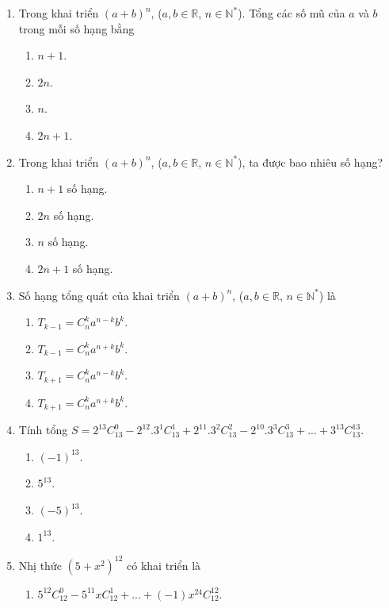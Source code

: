 \begin{enumerate}[label=\textbf{Câu \arabic*.},align=left,left=0cm..0cm,itemindent=*]
\begin{enumerate}[label=\textbf{\Alph*.},align=left,left=1cm..0cm,itemindent=*]
	\end{enumerate}
	\item Trong khai triển $(a+b)^n$, ($a,b\in\mathbb{R}$, $n\in\mathbb{N}^{*}$). Tổng các số mũ của $a$ và $b$ trong mỗi số hạng bằng
	\begin{enumerate}[label=\textbf{\Alph*.},align=left,left=1cm..0cm,itemindent=*]
		\item $n+1$. \item $2n$. \item $n$. \item $2n+1$.
	\end{enumerate}
	\item Trong khai triển $(a+b)^n$, ($a,b\in\mathbb{R}$, $n\in\mathbb{N}^{*}$), ta được bao nhiêu số hạng?
	\begin{enumerate}[label=\textbf{\Alph*.},align=left,left=1cm..0cm,itemindent=*]
		\item $n+1$ số hạng. \item $2n$ số hạng. \item $n$ số hạng. \item $2n+1$ số hạng.
	\end{enumerate}
	\item Số hạng tổng quát của khai triển $(a+b)^n$, ($a,b\in\mathbb{R}$, $n\in\mathbb{N}^{*}$) là
	\begin{enumerate}[label=\textbf{\Alph*.},align=left,left=1cm..0cm,itemindent=*]
		\item $T_{k-1}=C_n^ka^{n-k}b^k$. \item $T_{k-1}=C_n^ka^{n+k}b^k$. \item $T_{k+1}=C_n^ka^{n-k}b^k$. \item $T_{k+1}=C_n^ka^{n+k}b^k$.
	\end{enumerate}
	\item Tính tổng $S=2^{13}C_{13}^0-2^{12}.3^1C_{13}^1+2^{11}.3^2C_{13}^2-2^{10}.3^3C_{13}^3+...+3^{13}C_{13}^{13}$.
	\begin{enumerate}[label=\textbf{\Alph*.},align=left,left=1cm..0cm,itemindent=*]
		\item $(-1)^{13}$. \item $5^{13}$. \item $(-5)^{13}$. \item $1^{13}$.
	\end{enumerate}
	\item Nhị thức $(5+x^2)^{12}$ có khai triển là
	\begin{enumerate}[label=\textbf{\Alph*.},align=left,left=1cm..0cm,itemindent=*]
		\item $5^{12}C_{12}^0-5^{11}xC_{12}^1+...+(-1)x^{24}C_{12}^{12}$.

\end{enumerate}
\end{enumerate}
